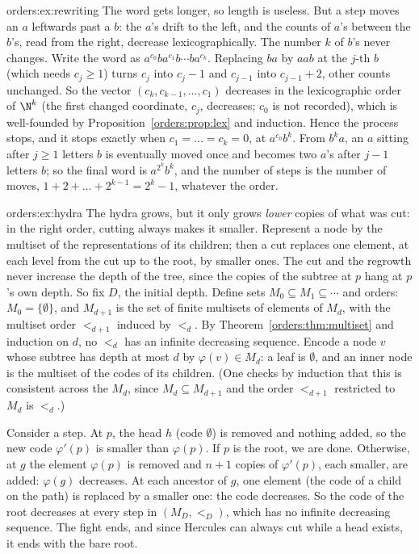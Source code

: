 \begin{solution}{orders:ex:rewriting}
\idea The word gets longer, so length is useless. But a step moves an $a$ leftwards past a $b$: the $a$'s drift to the left,
and the counts of $a$'s between the $b$'s, read from the right, decrease lexicographically.
\writeup The number $k$ of $b$'s never changes. Write the word as $a^{c_0}ba^{c_1}b\cdots ba^{c_k}$. Replacing $ba$ by $aab$ at the $j$-th $b$ (which needs
$c_j\ge1$) turns $c_j$ into $c_j-1$ and $c_{j-1}$ into $c_{j-1}+2$, other counts unchanged. So the vector $(c_k,c_{k-1},\dots,c_1)$ decreases in the
lexicographic order of $\N^k$ (the first changed coordinate, $c_j$, decreases; $c_0$ is not recorded), which is well-founded by
Proposition~\ref{orders:prop:lex} and induction. Hence the process stops, and it stops exactly when $c_1=\dots=c_k=0$, at $a^{c_0}b^k$.
From $b^ka$, an $a$ sitting after $j\ge1$ letters $b$ is eventually moved once and becomes two $a$'s after $j-1$ letters $b$; so the
final word is $a^{2^k}b^k$, and the number of steps is the number of moves, $1+2+\dots+2^{k-1}=2^k-1$, whatever the order.
\end{solution}

\begin{solution}{orders:ex:hydra}
\idea The hydra grows, but it only grows \emph{lower} copies of what was cut: in the right order, cutting always makes it
smaller. Represent a node by the multiset of the representations of its children; then a cut replaces one element, at each
level from the cut up to the root, by smaller ones.
\writeup The cut and the regrowth never increase the depth of the tree, since the copies of the subtree at $p$ hang at $p$'s own
depth. So fix $D$, the initial depth. Define sets $M_0\subseteq M_1\subseteq\cdots$ and orders: $M_0=\{\emptyset\}$, and $M_{d+1}$ is the set of finite multisets of
elements of $M_d$, with the multiset order $<_{d+1}$ induced by $<_d$. By Theorem~\ref{orders:thm:multiset} and induction on $d$, no $<_d$ has an
infinite decreasing sequence. Encode a node $v$ whose subtree has depth at most $d$ by $\varphi(v)\in M_d$: a leaf is $\emptyset$, and an
inner node is the multiset of the codes of its children. (One checks by induction that this is consistent across the
$M_d$, since $M_d\subseteq M_{d+1}$ and the order $<_{d+1}$ restricted to $M_d$ is $<_d$.)

Consider a step. At $p$, the head $h$ (code $\emptyset$) is removed and nothing added, so the new code $\varphi'(p)$ is smaller than $\varphi(p)$. If $p$ is the
root, we are done. Otherwise, at $g$ the element $\varphi(p)$ is removed and $n+1$ copies of $\varphi'(p)$, each smaller, are added: $\varphi(g)$
decreases. At each ancestor of $g$, one element (the code of a child on the path) is replaced by a smaller one: the code
decreases. So the code of the root decreases at every step in $(M_D,<_D)$, which has no infinite decreasing sequence. The
fight ends, and since Hercules can always cut while a head exists, it ends with the bare root.
\end{solution}

